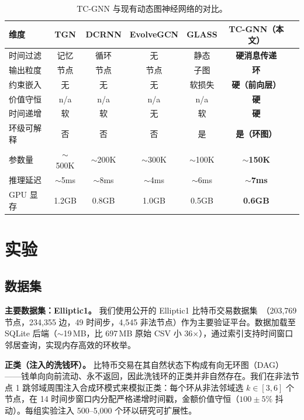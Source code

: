 \documentclass[journal,onecolumn]{IEEEtran}
\begin{document}
\begin{table}[t]
\centering
\caption{\textsc{TC-GNN} 与现有动态图神经网络的对比。}
\label{tab:comparison}
\small
\begin{tabular}{lcccccc}
\toprule
\textbf{维度} & \textbf{TGN} & \textbf{DCRNN} & \textbf{EvolveGCN} & \textbf{GLASS} & \textbf{TC-GNN（本文）} \\
\midrule
时间过滤 & 记忆 & 循环 & 无 & 静态 & \textbf{硬消息传递} \\
输出粒度 & 节点 & 节点 & 节点 & 子图 & \textbf{环} \\
约束嵌入 & 无 & 无 & 无 & 软损失 & \textbf{硬（前向层）} \\
价值守恒 & n/a & n/a & n/a & n/a & \textbf{硬} \\
时间递增 & 软 & 软 & 无 & 软 & \textbf{硬} \\
环级可解释 & 否 & 否 & 否 & 是 & \textbf{是（环图）} \\
参数量 & $\sim$500K & $\sim$200K & $\sim$300K & $\sim$100K & \textbf{$\sim$150K} \\
推理延迟 & $\sim$5ms & $\sim$8ms & $\sim$4ms & $\sim$6ms & \textbf{$\sim$7ms} \\
GPU 显存 & 1.2GB & 0.8GB & 1.0GB & 0.5GB & \textbf{0.6GB} \\
\bottomrule
\end{tabular}
\end{table}

\section{实验}
\label{sec:exp}

\subsection{数据集}
\label{sec:exp-data}

\textbf{主要数据集：Elliptic1。} 我们使用公开的 Elliptic1 比特币交易数据集~\cite{ellipticData2019}（203{,}769 节点，234{,}355 边，49 时间步，4{,}545 非法节点）作为主要验证平台。数据加载至 SQLite 后端（$\sim$19\,MB，比 697\,MB 原始 CSV 小 36$\times$），通过索引支持时间窗口邻居查询，实现内存高效的环枚举。

\textbf{正类（注入的洗钱环）。} 比特币交易在其自然状态下构成有向无环图（DAG）——钱单向向前流动、永不返回，因此洗钱环的正类并非自然存在。我们在非法节点 1 跳邻域周围注入合成环模式来模拟正类：每个环从非法邻域选 $k \in [3, 6]$ 个节点，在 14 时间步窗口内分配严格递增时间戳，金额价值守恒（$100 \pm 5\%$ 抖动）。每组实验注入 500--5{,}000 个环以研究可扩展性。
\end{document}
